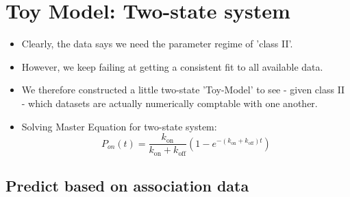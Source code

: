 \documentclass[a4paper,twoside]{revtex4-1}
\newcommand{\rate }[1]{\ensuremath{k_{\text{#1}}} }
\begin{document}
\section{Toy Model: Two-state system}


\begin{itemize}
\item Clearly, the data says we need the parameter regime of 'class II'. 
\item However, we keep failing at getting a consistent fit to all available data.
\item We therefore constructed a little two-state 'Toy-Model' to see - given class II - which datasets are actually numerically comptable with one another. 
\item Solving Master Equation for two-state system:
\begin{equation}
P_{on}(t) = \frac{\rate{on}}{ \rate{on} + \rate{off}} \left(1 - e^{-(\rate{on}+\rate{off})t} \right)
\end{equation}
\end{itemize}


\subsection{Predict based on association data}
\end{document}
